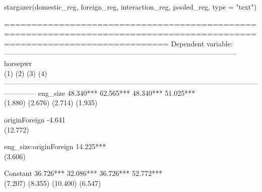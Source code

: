 \documentclass[
  letterpaper,
]{book}
\newenvironment{Shaded}{\begin{snugshade}}{\end{snugshade}}
\newcommand{\AttributeTok}[1]{\textcolor[rgb]{0.40,0.45,0.13}{#1}}
\newcommand{\CommentTok}[1]{\textcolor[rgb]{0.37,0.37,0.37}{#1}}
\newcommand{\FunctionTok}[1]{\textcolor[rgb]{0.28,0.35,0.67}{#1}}
\newcommand{\NormalTok}[1]{\textcolor[rgb]{0.00,0.23,0.31}{#1}}
\newcommand{\OtherTok}[1]{\textcolor[rgb]{0.00,0.23,0.31}{#1}}
\newcommand{\SpecialCharTok}[1]{\textcolor[rgb]{0.37,0.37,0.37}{#1}}
\newcommand{\StringTok}[1]{\textcolor[rgb]{0.13,0.47,0.30}{#1}}
\begin{document}
\begin{Shaded}
\end{Shaded}

\begin{Shaded}
\begin{Highlighting}[]
\FunctionTok{stargazer}\NormalTok{(domestic\_reg, foreign\_reg, interaction\_reg, pooled\_reg, }\AttributeTok{type =} \StringTok{"text"}\NormalTok{)}
\end{Highlighting}
\end{Shaded}

==========================================================================================================================
Dependent variable:\\
---------------------------------------------------------------------------------------------------
horsepwr\\
(1) (2) (3) (4)\\
--------------------------------------------------------------------------------------------------------------------------
eng\_size 48.340*** 62.565*** 48.340*** 51.025***\\
(1.880) (2.676) (2.714) (1.935)

originForeign -4.641\\
(12.772)

eng\_size:originForeign 14.225***\\
(3.606)

Constant 36.726*** 32.086*** 36.726*** 52.772***\\
(7.207) (8.355) (10.400) (6.547)
\end{document}
